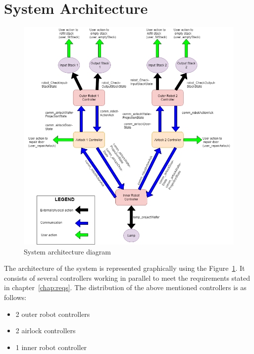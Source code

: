 \section{System Architecture}
\begin{figure}[h]
\centering
\includegraphics[width=150mm]{img/sv-project-arch.png}
\caption{System architecture diagram\label{fig:arch}}
\end{figure}

The architecture of the system is represented graphically using the Figure~{\ref{fig:arch}}. It consists of several controllers working in parallel to meet the requirements stated in chapter~{\ref{chap:reqs}}. The distribution of the above mentioned controllers is as follows:

\begin{itemize}
    \item 2 outer robot controllers
    \item 2 airlock controllers
    \item 1 inner robot controller
\end{itemize}

